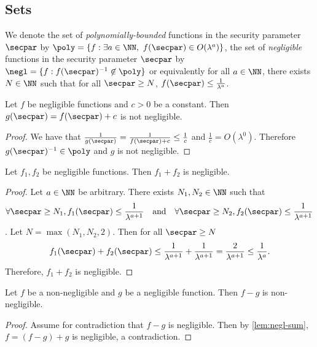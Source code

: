 \subsection{Sets}

We denote the set of \emph{polynomially-bounded} functions in the security parameter $\secpar$ by $\poly = \{ f : \exists a \in \NN,\ f(\secpar) \in O(\lambda^a) \}$,
the set of \emph{negligible} functions in the security parameter $\secpar$ by $\negl = \{ f : f(\secpar)^{-1} \not\in \poly \}$
or equivalently for all $a \in \NN$, there exists $N \in \NN$ such that for all $\secpar \ge N$, $f(\secpar) \le \frac{1}{\lambda^a}$.

\begin{proposition}
  Let $f$ be negligible functions and $c > 0$ be a constant. Then $g(\secpar) = f(\secpar) + c$ is not negligible.
\end{proposition}
\begin{proof}
  We have that $\frac{1}{g(\secpar)} = \frac{1}{f(\secpar) + c} \le \frac{1}{c}$
  and $\frac{1}{c} = O(\lambda^0)$. Therefore $g(\secpar)^{-1} \in \poly$ and $g$ is not negligible.
\end{proof}

\begin{proposition}
  \label{lem:negl-sum}
  Let $f_1, f_2$ be negligible functions. Then $f_1 + f_2$ is negligible.
\end{proposition}
\begin{proof}
  Let $a \in \NN$ be arbitrary.
  There exists $N_1, N_2 \in \NN$ such that
  \[
  \forall \secpar \ge N_1, f_1(\secpar) \le \frac{1}{\lambda^{a+1}} \quad \text{and} \quad \forall \secpar \ge N_2, f_2(\secpar) \le \frac{1}{\lambda^{a+1}}
  \].
  Let $N = \max(N_1, N_2, 2)$. Then for all $\secpar \ge N$
  \[
    f_1(\secpar) + f_2(\secpar) \le \frac{1}{\lambda^{a+1}} + \frac{1}{\lambda^{a+1}} = \frac{2}{\lambda^{a+1}} \le \frac{1}{\lambda^{a}}.
  \]
  Therefore, $f_1 + f_2$ is negligible.
\end{proof}

\begin{proposition}
  \label{lem:non-negl-diff}
  Let $f$ be a non-negligible and $g$ be a negligible function.
  Then $f - g$ is non-negligible.
\end{proposition}
\begin{proof}
  Assume for contradiction that $f - g$ is negligible.
  Then by \cref{lem:negl-sum}, $f = (f - g) + g$ is negligible, a contradiction.
\end{proof}

